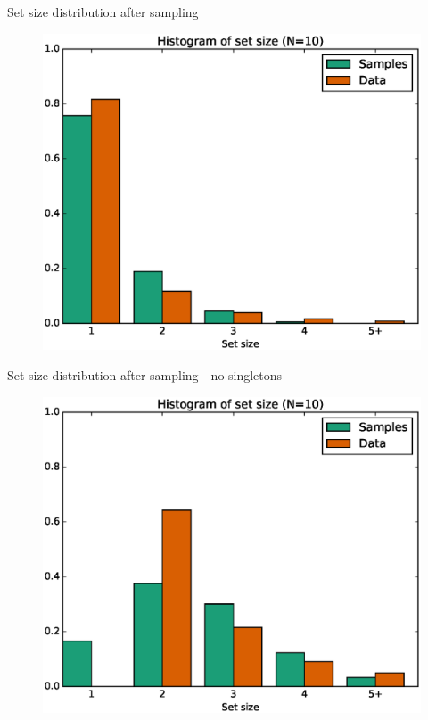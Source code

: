 \documentclass{beamer}
\begin{document}
\begin{frame}{Set size distribution after sampling}
  \begin{figure}
    \centering
    \includegraphics[height=0.8\textheight]{data_sampling_histogram_10_with_singletons}
  \end{figure}
\end{frame}

\begin{frame}{Set size distribution after sampling - no singletons}
  \begin{figure}
    \centering
    \includegraphics[height=0.8\textheight]{data_sampling_histogram_10}
  \end{figure}
\end{frame}
\end{document}
